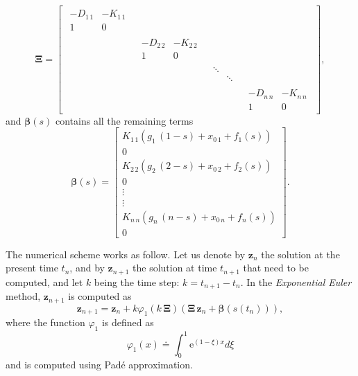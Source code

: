 \documentclass[fleqn, 11pt]{article}
\theoremstyle{definition}
\theoremstyle{plain}
\theoremstyle{remark}
\begin{document}
\begin{equation}
    \label{eq:DMPs_vector_form_linear_part}
    \bm{\Xi} =
        \begin{bmatrix}
            \begin{matrix}
                - D_{1\,1} & - K_{1\,1} \\
                1   & 0
            \end{matrix} \\ &
            \begin{matrix}
                - D_{2\,2} & - K_{2\,2} \\
                1   & 0
            \end{matrix} \\ & &
            \begin{matrix}
                \ddots \\ & \ddots
            \end{matrix} \\ & & &
            \begin{matrix}
                - D_{n\,n} & - K_{n\,n} \\
                1   & 0
            \end{matrix}
        \end{bmatrix},
\end{equation}
and $\bm{\beta}(s)$ contains all the remaining terms
\begin{equation}
    \bm{\beta} (s) = 
    \begin{bmatrix}
        K_{1\,1} (g_{1} \, (1 - s) + x_{0\, 1} + f_{1} (s)) \\
        0 \\
        K_{2\,2} (g_{2} \, (2 - s) + x_{0\, 2} + f_{2} (s)) \\
        0 \\
        \vdots \\
        \vdots \\
        K_{n\,n} (g_{n} \, (n - s) + x_{0\, n} + f_{n} (s)) \\
        0
    \end{bmatrix}.
\end{equation}

The numerical scheme works as follow.
Let us denote by $ \mathbf{z}_{n} $ the solution at the present time $t_n$, and by $ \mathbf{z}_{n+1} $ the solution at time $t_{n+1}$ that need to be computed, and let $ k $ being the time step: \( k = t_{n+1} - t_n \).
In the \emph{Exponential Euler} method, $\mathbf{z}_{n+1}$ is computed as
\begin{equation}
    \mathbf{z}_{n+1} = \mathbf{z}_n + k \varphi_1(k\,\bm{\Xi}) \left( { \bm{\Xi} \, \mathbf{z}_n + \bm{\beta}(s (t_n)) } \right)  ,
\end{equation}
where the function $ \varphi_1 $ is defined as
\begin{equation}
    \varphi_1( x ) \doteq \int_{0}^{1} \text{e} ^ {(1 - \xi) x} d\! \xi
\end{equation}
and is computed using Pad\'e approximation.
\end{document}

